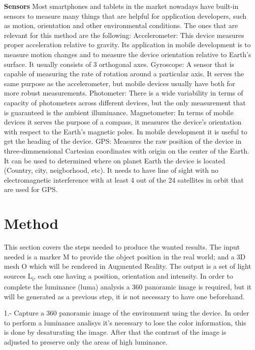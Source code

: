\documentclass{article}
\begin{document}
\textbf{Sensors}\newline
Most smartphones and tablets in the market nowadays have built-in sensors to measure many things that are helpful for application developers, such as motion, orientation and other environmental conditions. The ones that are relevant for this method are the following:\newline
Accelerometer: This device measures proper acceleration relative to gravity. Its application in mobile development is to measure motion changes and to measure the device orientation relative to Earth's surface. It usually consists of 3 orthogonal axes. \newline
Gyroscope: A sensor that is capable of measuring the rate of rotation around a particular axis. It serves the same purpose as the accelerometer, but mobile devices usually have both for more robust measurements. \newline
Photometer: There is a wide variability in terms of capacity of photometers across different devices, but the only measurement that is guaranteed is the ambient illuminance. \newline 
Magnetometer: In terms of mobile devices it serves the purpose of a compass, it measures the device's orientation with respect to the Earth's magnetic poles. In mobile development it is useful to get the heading of the device.\newline
GPS: Measures the raw position of the device in three-dimmensional Cartesian coordinates with origin on the center of the Earth. It can be used to determined where on planet Earth the device is located (Country, city, neigborhood, etc). It needs to have line of sight with no electromagnetic interference with at least 4 out of the 24 satellites in orbit that are used for GPS. \newline
\section{Method}
This section covers the steps needed to produce the wanted results. The input needed is a marker M to provide the object position in the real world; and a 3D mesh O which will be rendered in Augmented Reality. The output is a set of light sources L\textsubscript{i}, each one having a position, orientation and intensity. In order to complete the luminance (luma) analysis a 360 panoramic image is required, but it will be generated as a previous step, it is not necessary to have one beforehand.

1.- Capture a 360 panoramic image of the environment using the device. In order to perform a luminance analisys it's necessary to lose the color information, this is done by desaturating the image. After that the contrast of the image is adjusted to preserve only the areas of high luminance.
\end{document}
